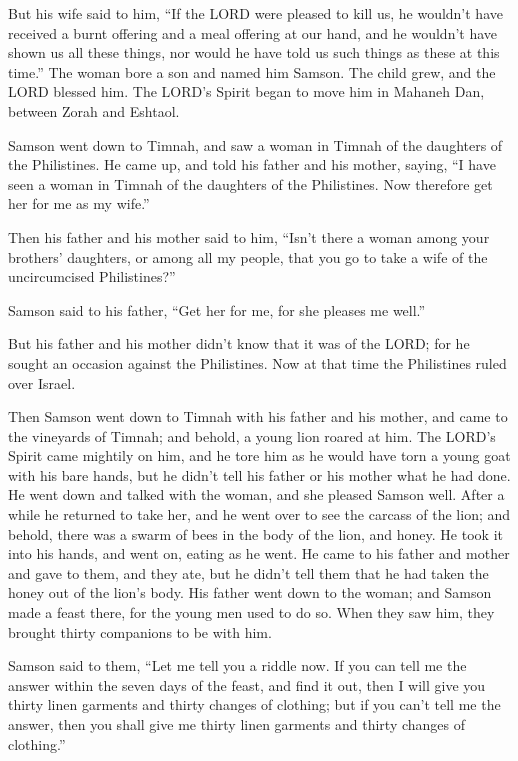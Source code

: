 \myverse{}But his wife said to him, “If the LORD were pleased to kill
us, he wouldn’t have received a burnt offering and a meal offering at our hand, and he wouldn’t have shown
us all these things, nor would he have told us such things as these at this time.”
\myverse{}The woman bore a son and named him Samson. The child grew, and the LORD blessed
him.
\myverse{}The LORD’s Spirit began to move him in Mahaneh Dan, between Zorah and Eshtaol.


\mychapter{} \myverse*{}Samson went down to Timnah, and saw a woman in Timnah of the daughters
of the Philistines.
\myverse{}He came up, and told his father and his mother, saying, “I have seen a woman
in Timnah of the daughters of the Philistines. Now therefore get her for me as my wife.”

\myverse{}Then his father and his mother said to him, “Isn’t there a woman
among your brothers’ daughters, or among all my people, that you go to take a wife of the uncircumcised
Philistines?”

Samson said to his father, “Get her for me, for she pleases me well.”

\myverse{}But his father and his mother didn’t know that it was of the LORD;
for he sought an occasion against the Philistines. Now at that time the Philistines ruled over Israel.

\myverse{}Then Samson went down to Timnah with his father and his mother,
and came to the vineyards of Timnah; and behold, a young lion roared at him.
\myverse{}The LORD’s Spirit came mightily on him, and he tore him as he would have torn
a young goat with his bare hands, but he didn’t tell his father or his mother what he had done.
\myverse{}He went down and talked with the woman, and she pleased Samson well.
\myverse{}After a while he returned to take her, and he went over to see the carcass
of the lion; and behold, there was a swarm of bees in the body of the lion, and honey.
\myverse{}He took it into his hands, and went on, eating as he went. He came to his father
and mother and gave to them, and they ate, but he didn’t tell them that he had taken the honey out of
the lion’s body.
\myverse{}His father went down to the woman; and Samson made a feast there, for the
young men used to do so.
\myverse{}When they saw him, they brought thirty companions to be with him.

\myverse{}Samson said to them, “Let me tell you a riddle now. If you can
tell me the answer within the seven days of the feast, and find it out, then I will give you thirty linen
garments and thirty changes of clothing;
\myverse{}but if you can’t tell me the answer, then you shall give me thirty linen
garments and thirty changes of clothing.”

